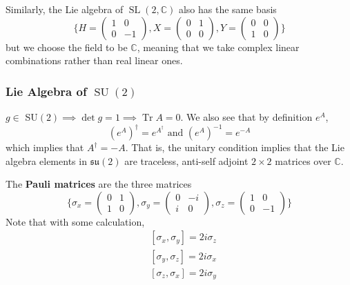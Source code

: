 \documentclass{article}
\DeclareMathOperator{\Tr}{Tr}
\DeclareMathOperator{\SL}{SL}
\DeclareMathOperator{\SU}{SU}
\newcounter{definition}[section]
\begin{document}
    Similarly, the Lie algebra of $\SL(2, \mathbb{C})$ also has the same basis 
    \begin{equation}
      \bigg\{ H = \begin{pmatrix}
      1&0\\0&-1
      \end{pmatrix}, X = \begin{pmatrix}
      0&1\\0&0
      \end{pmatrix}, Y = \begin{pmatrix}
      0&0\\1&0
      \end{pmatrix}\bigg\}
    \end{equation}
    but we choose the field to be $\mathbb{C}$, meaning that we take complex linear combinations rather than real linear ones. 

  \subsubsection[Lie Algebra of SU(2)]{Lie Algebra of \(\SU(2)\)}
    \label{sec:lie-algebra-su2}

    $g \in $ SU$(2) \implies \det{g} = 1 \implies \Tr{A} = 0$. We also see that by definition $e^A$, 
    \begin{equation}
      (e^A)^\dagger = e^{A^\dagger} \text{ and } (e^A)^{-1} = e^{-A}
    \end{equation}
    which implies that $A^\dagger = - A$. That is, the unitary condition implies that the Lie algebra elements in $\mathfrak{su}(2)$ are traceless, anti-self adjoint $2 \times 2$ matrices over $\mathbb{C}$. 

    \begin{definition}
      \label{def:pauli-matrices}
      The \textbf{Pauli matrices} are the three matrices
      \begin{equation}
        \bigg\{ \sigma_x = \begin{pmatrix}
        0&1\\1&0
        \end{pmatrix}, \sigma_y = \begin{pmatrix}
        0&-i\\i&0
        \end{pmatrix}, \sigma_z = \begin{pmatrix}
        1&0\\0&-1
        \end{pmatrix}\bigg\}
      \end{equation}
      Note that with some calculation, 
      \begin{align*}
        & [\sigma_x, \sigma_y] = 2 i \sigma_z \\
        & [\sigma_y, \sigma_z] = 2 i \sigma_x \\
        & [\sigma_z, \sigma_x] = 2 i \sigma_y
      \end{align*}
    \end{definition}
\end{document}

